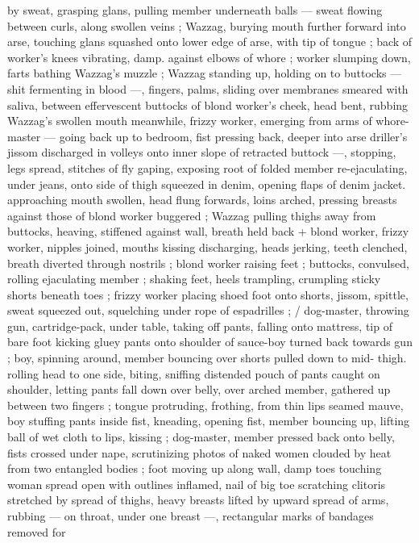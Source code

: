 by sweat, grasping glans, pulling member underneath balls --- sweat
flowing between curls, along swollen veins ; Wazzag, burying mouth
further forward into arse, touching glans squashed onto lower edge
of arse, with tip of tongue ; back of worker's knees vibrating, damp.
against elbows of whore ; worker slumping down, farts bathing
Wazzag's muzzle ; Wazzag standing up, holding on to buttocks ---
shit fermenting in blood ---, fingers, palms, sliding over membranes
smeared with saliva, between effervescent buttocks of blond
worker's cheek, head bent, rubbing Wazzag’s swollen mouth
meanwhile, frizzy worker, emerging from arms of whore-master ---
going back up to bedroom, fist pressing back, deeper into arse
driller's jissom discharged in volleys onto inner slope of retracted
buttock ---, stopping, legs spread, stitches of fly gaping, exposing
root of folded member re-ejaculating, under jeans, onto side of thigh
squeezed in denim, opening flaps of denim jacket. approaching
mouth swollen, head flung forwards, loins arched, pressing breasts
against those of blond worker buggered ; Wazzag pulling thighs
away from buttocks, heaving, stiffened against wall, breath held back
+ blond worker, frizzy worker, nipples joined, mouths kissing
discharging, heads jerking, teeth clenched, breath diverted through
nostrils ; blond worker raising feet ; buttocks, convulsed, rolling
ejaculating member ; shaking feet, heels trampling, crumpling sticky
shorts beneath toes ; frizzy worker placing shoed foot onto shorts,
jissom, spittle, sweat squeezed out, squelching under rope of
espadrilles ; / dog-master, throwing gun, cartridge-pack, under table,
taking off pants, falling onto mattress, tip of bare foot kicking gluey
pants onto shoulder of sauce-boy turned back towards gun ; boy,
spinning around, member bouncing over shorts pulled down to mid-
thigh. rolling head to one side, biting, sniffing distended pouch of
pants caught on shoulder, letting pants fall down over belly, over
arched member, gathered up between two fingers ; tongue
protruding, frothing, from thin lips seamed mauve, boy stuffing pants
inside fist, kneading, opening fist, member bouncing up, lifting ball
of wet cloth to lips, kissing ; dog-master, member pressed back onto
belly, fists crossed under nape, scrutinizing photos of naked women
clouded by heat from two entangled bodies ; foot moving up along
wall, damp toes touching woman spread open with outlines inflamed,
nail of big toe scratching clitoris stretched by spread of thighs,
heavy breasts lifted by upward spread of arms, rubbing --- on throat,
under one breast ---, rectangular marks of bandages removed for

